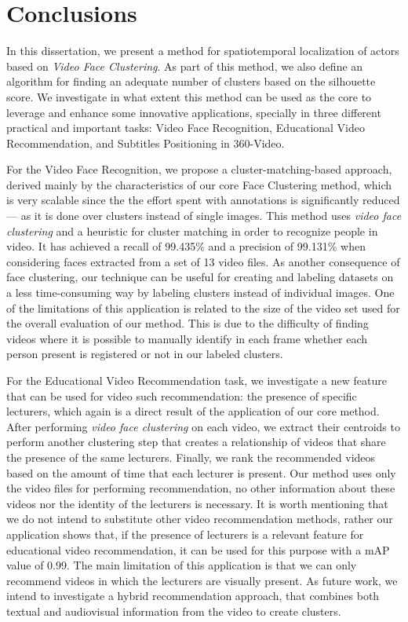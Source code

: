 \newpage

\chapter{Conclusions}
\label{chap:conclusions}

In this dissertation, we present a method for spatiotemporal localization of actors based on \emph{Video Face Clustering}. As part of this method, we also define an algorithm for finding an adequate number of clusters based on the silhouette score. We investigate in what extent this method can be used as the core to leverage and enhance some innovative applications, specially in three different  practical and important tasks: Video Face Recognition, Educational Video Recommendation, and Subtitles Positioning in 360-Video.

For the Video Face Recognition, we propose a cluster-matching-based approach, derived mainly by the characteristics of our core Face Clustering method, which is very scalable since the the effort spent with annotations is significantly reduced --- as it is done over clusters instead of single images. This method uses \emph{video face clustering} and a heuristic for cluster matching in order to recognize people in video. It has achieved a recall of 99.435\% and a precision of 99.131\% when considering faces extracted from a set of 13 video files. As another consequence of face clustering, our technique can be useful for creating and labeling datasets on a less time-consuming way by labeling clusters instead of individual images. One of the limitations of this application is related to the size of the video set used for the overall evaluation of our method. This is due to the difficulty of finding videos where it is possible to manually identify in each frame whether each person present is registered or not in our labeled clusters.

For the Educational Video Recommendation task, we investigate a new feature that can be used for video such recommendation: the presence of specific lecturers, which again is a direct result of the application of our core method. After performing \emph{video face clustering} on each video, we extract their centroids to perform another clustering step that creates a relationship of videos that share the presence of the same lecturers. Finally, we rank the recommended videos based on the amount of time that each lecturer is present. Our method uses only the video files for performing recommendation, no other information about these videos nor the identity of the lecturers is necessary. It is worth mentioning that we do not intend to substitute other video recommendation methods, rather our application shows that, if the presence of lecturers is a relevant feature for educational video recommendation, it can be used for this purpose with a mAP value of 0.99. The main limitation of this application is that we can only recommend videos in which the lecturers are visually present. As future work, we intend to investigate a hybrid recommendation approach, that combines both textual and audiovisual information from the video to create clusters.

